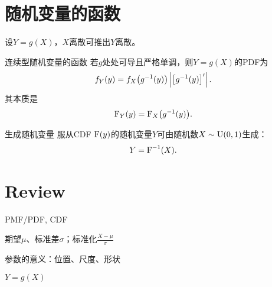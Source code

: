 \section{随机变量的函数}

设$Y=g(X)$，$X$离散可推出$Y$离散。

\begin{theorem}{连续型随机变量的函数}{}
	若$g$处处可导且严格单调，则$Y=g(X)$的PDF为
	\begin{align}
		f_Y(y)=f_X\bigl(g^{-1}(y)\bigr)\left\lvert\left[g^{-1}(y)\right]'\right\rvert.
	\end{align}
	其本质是
	\begin{align}
		\operatorname{F}_Y(y)=\operatorname{F}_X\bigl(g^{-1}(y)\bigr).
	\end{align}
\end{theorem}
\begin{example}{生成随机变量}{}
	服从CDF $\operatorname{F}(y)$的随机变量$Y$可由随机数$X\sim\operatorname{U}(0,1)$生成：
	\begin{align}
		Y=\operatorname{F}^{-1}(X).
	\end{align}
\end{example}
\section*{Review}
\begin{compactenum}
	\item PMF/PDF, CDF
	\item 期望$\mu$、标准差$\sigma$；标准化$\frac{X-\mu}\sigma$
	\item 参数的意义：位置、尺度、形状
	\item $Y=g(X)$
\end{compactenum}